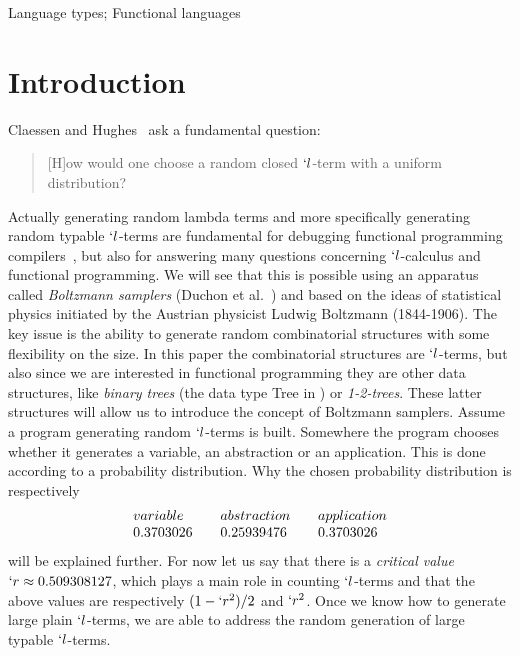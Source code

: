 \documentclass{sig-alternate}
\begin{document}
\ifICFP
\begin{sloppypar}
     { Language types;} {
    Functional languages} 
\end{sloppypar}
\fi


\section{Introduction}
Claessen and Hughes~\cite{DBLP:conf/icfp/ClaessenH00} ask a fundamental question:
\begin{it}
  \begin{quotation} [H]ow would one choose a random closed \mbox{$`l$-term} with a uniform
    distribution?
  \end{quotation}
\end{it}
Actually generating random lambda terms and more specifically generating random
typable $`l$-terms are fundamental for debugging functional programming
compilers~\cite{Palka:2011:TOC:1982595.1982615}, but also for answering many
questions concerning $`l$-calculus and functional programming.  We will see that this
is possible using an apparatus called \emph{Boltzmann samplers} (Duchon et
al.~\cite{DBLP:journals/cpc/DuchonFLS04}) and based on the ideas of statistical
physics initiated by the Austrian physicist Ludwig Boltzmann (1844-1906).  The key
issue is the ability to generate random combinatorial structures with some
flexibility on the size. In this paper the combinatorial structures are
\mbox{$`l$-terms}, but also since we are interested in functional programming they
are other data structures, like \emph{binary trees} (the data type \textsf{Tree}
in \cite{DBLP:conf/icfp/ClaessenH00}) or \emph{1-2-trees}.  These latter  structures
will allow us to introduce the concept of Boltzmann samplers.  Assume a program
generating random $`l$-terms is built.  Somewhere the program chooses whether it generates a
variable, an abstraction or an application. This is done according to a probability
distribution.  Why the chosen probability distribution is
respectively
\begin{displaymath}
  \begin{array}{l@{\qquad}l@{\qquad}l}
variable & abstraction & application\\
  0.3703026 & 0.25939476 & 0.3703026
\end{array}
\end{displaymath}
will be explained further.  For now let us say that there is a  \emph{critical value}
${`r\approx 0.509308127}$,  which plays a main role in counting
$`l$-terms and that the above values are respectively $(1-`r^2)/2$ and $`r^2$.  Once
we know how to generate large plain $`l$-terms, we are able to address the
random generation of large typable $`l$-terms.
\end{document}
